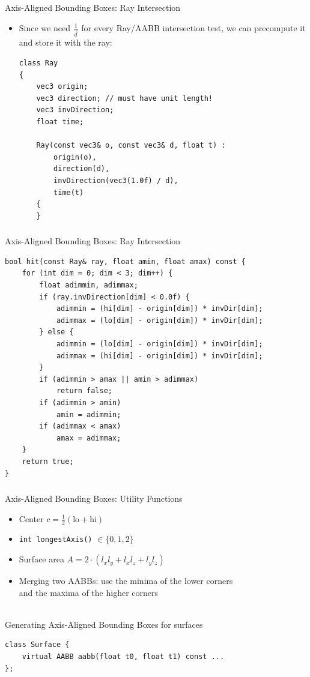 \documentclass[utf8,stillsansserifmath,fleqn,t]{beamer}
\newcommand{\code}[1]{\texttt{#1}}
\begin{document}
\begin{frame}[fragile,label=aabb-2]
\frametitle{\insertsection}
Axis-Aligned Bounding Boxes: Ray Intersection
\begin{itemize}
\item Since we need $\frac{1}{\vec{d}}$ for every Ray/AABB intersection test,
we can precompute it and store it with the ray:
\begin{lstlisting}
class Ray
{
    vec3 origin;
    vec3 direction; // must have unit length!
    vec3 invDirection;
    float time;

    Ray(const vec3& o, const vec3& d, float t) :
        origin(o),
        direction(d),
        invDirection(vec3(1.0f) / d),
        time(t)
    {
    }
\end{lstlisting}
\end{itemize}
\end{frame}

\begin{frame}[fragile]
\frametitle{\insertsection}
Axis-Aligned Bounding Boxes: Ray Intersection
\begin{lstlisting}
bool hit(const Ray& ray, float amin, float amax) const {
    for (int dim = 0; dim < 3; dim++) {
        float adimmin, adimmax;
        if (ray.invDirection[dim] < 0.0f) {
            adimmin = (hi[dim] - origin[dim]) * invDir[dim];
            adimmax = (lo[dim] - origin[dim]) * invDir[dim];
        } else {
            adimmin = (lo[dim] - origin[dim]) * invDir[dim];
            adimmax = (hi[dim] - origin[dim]) * invDir[dim];
        }
        if (adimmin > amax || amin > adimmax)
            return false;
        if (adimmin > amin)
            amin = adimmin;
        if (adimmax < amax)
            amax = adimmax;
    }
    return true;
}
\end{lstlisting}
\end{frame}

\begin{frame}[fragile]
\frametitle{\insertsection}
Axis-Aligned Bounding Boxes: Utility Functions
\begin{itemize}
\item Center $c = \frac{1}{2}(\text{lo} + \text{hi})$
\item \code{int longestAxis()} $\in \{0, 1, 2\}$
\item Surface area $A = 2\cdot(l_x l_y + l_x l_z + l_y l_z)$
\item Merging two AABBs: use the minima of the lower corners\\
and the maxima of the higher corners
\end{itemize}
~\\
Generating Axis-Aligned Bounding Boxes for surfaces
\begin{lstlisting}
class Surface {
    virtual AABB aabb(float t0, float t1) const ...
};
\end{lstlisting}
\end{frame}
\end{document}
